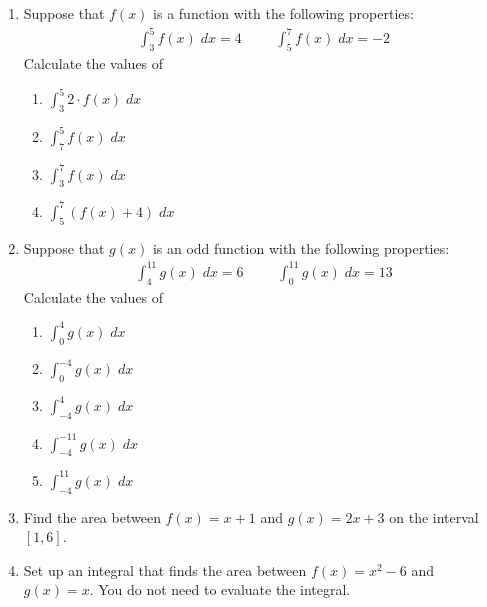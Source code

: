 \documentclass[11pt]{article}
\begin{document}
\drawtitle

\begin{enumerate}
\item Suppose that $f(x)$ is a function with the following properties:
  \begin{align*}
    \int_3^5 f(x)\;dx = 4 &&& \int_5^7 f(x)\;dx = -2
  \end{align*}
  Calculate the values of
  \begin{enumerate}
  \item $\displaystyle \int_3^5 2\cdot f(x)\;dx$
    \vfill
  \item $\displaystyle \int_7^5 f(x)\;dx$
    \vfill
  \item $\displaystyle \int_3^7 f(x)\;dx$
    \vfill
  \item $\displaystyle \int_5^7 (f(x) + 4)\;dx$
    \vfill
  \end{enumerate}

\newpage

\item Suppose that $g(x)$ is an odd function with the following properties:
  \begin{align*}
    \int_4^{11} g(x)\;dx = 6 &&& \int_0^{11} g(x)\;dx = 13
  \end{align*}
  Calculate the values of
  \begin{enumerate}
  \item $\displaystyle \int_0^4 g(x)\;dx$
    \vfill
  \item $\displaystyle \int_0^{-4} g(x)\;dx$
    \vfill
  \item $\displaystyle \int_{-4}^4 g(x)\;dx$
    \vfill

    \newpage

  \item $\displaystyle \int_{-4}^{-11} g(x)\;dx$
    \vfill
  \item $\displaystyle \int_{-4}^{11} g(x)\;dx$
    \vfill
  \end{enumerate}

  \newpage

\item Find the area between $f(x) = x+1$ and $g(x) = 2x+3$ on the interval $[1,6]$.

  \vfill

\item Set up an integral that finds the area between $f(x) = x^2 - 6$
  and $g(x) = x$.  You do not need to evaluate the integral.

  \vfill

\end{enumerate}
\end{document}

